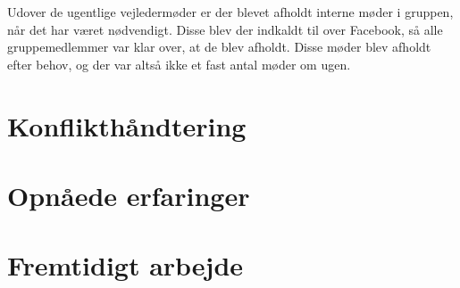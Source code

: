 Udover de ugentlige vejledermøder er der blevet afholdt interne møder i gruppen, når det har været nødvendigt. Disse blev der indkaldt til over Facebook, så alle gruppemedlemmer var klar over, at de blev afholdt. Disse møder blev afholdt efter behov, og der var altså ikke et fast antal møder om ugen. 


\section{Konflikthåndtering}

\section{Opnåede erfaringer}

\section{Fremtidigt arbejde}